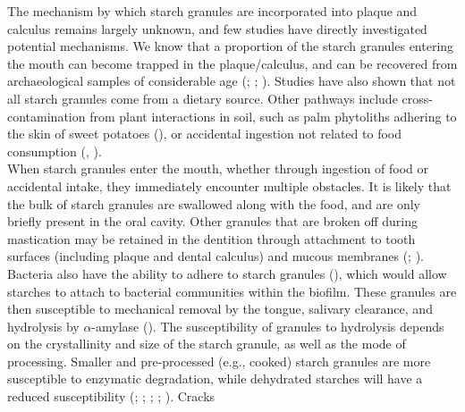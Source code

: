 \documentclass[
  b5paper,
]{book}
\begin{document}
The mechanism by which starch granules are incorporated into plaque and
calculus remains largely unknown, and few studies have directly
investigated potential mechanisms. We know that a proportion of the
starch granules entering the mouth can become trapped in the
plaque/calculus, and can be recovered from archaeological samples of
considerable age (; ; ). Studies have
also shown that not all starch granules come from a dietary source.
Other pathways include cross-contamination from plant interactions in
soil, such as palm phytoliths adhering to the skin of sweet potatoes
(), or
accidental ingestion not related to food consumption
(,
).\\
When starch granules enter the mouth, whether through ingestion of food
or accidental intake, they immediately encounter multiple obstacles. It
is likely that the bulk of starch granules are swallowed along with the
food, and are only briefly present in the oral cavity. Other granules
that are broken off during mastication may be retained in the dentition
through attachment to tooth surfaces (including plaque and dental
calculus) and mucous membranes
(;
).
Bacteria also have the ability to adhere to starch granules
(), which
would allow starches to attach to bacterial communities within the
biofilm. These granules are then susceptible to mechanical removal by
the tongue, salivary clearance, and hydrolysis by \(\alpha\)-amylase
(). The
susceptibility of granules to hydrolysis depends on the crystallinity
and size of the starch granule, as well as the mode of processing.
Smaller and pre-processed (e.g., cooked) starch granules are more
susceptible to enzymatic degradation, while dehydrated starches will
have a reduced susceptibility
(;
;
;
;
). Cracks
\end{document}
